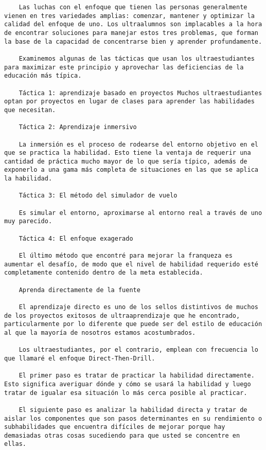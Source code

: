 \begin{verbatim}
	Las luchas con el enfoque que tienen las personas generalmente vienen en tres variedades amplias: comenzar, mantener y optimizar la calidad del enfoque de uno. Los ultraalumnos son implacables a la hora de encontrar soluciones para manejar estos tres problemas, que forman la base de la capacidad de concentrarse bien y aprender profundamente.
	
	Examinemos algunas de las tácticas que usan los ultraestudiantes para maximizar este principio y aprovechar las deficiencias de la educación más típica. 
	
	Táctica 1: aprendizaje basado en proyectos Muchos ultraestudiantes optan por proyectos en lugar de clases para aprender las habilidades que necesitan.
	
	Táctica 2: Aprendizaje inmersivo
	
	La inmersión es el proceso de rodearse del entorno objetivo en el que se practica la habilidad. Esto tiene la ventaja de requerir una cantidad de práctica mucho mayor de lo que sería típico, además de exponerlo a una gama más completa de situaciones en las que se aplica la habilidad.
	
	Táctica 3: El método del simulador de vuelo
	
	Es simular el entorno, aproximarse al entorno real a través de uno muy parecido.
	
	Táctica 4: El enfoque exagerado
	
	El último método que encontré para mejorar la franqueza es aumentar el desafío, de modo que el nivel de habilidad requerido esté completamente contenido dentro de la meta establecida. 
	
	Aprenda directamente de la fuente
	
	El aprendizaje directo es uno de los sellos distintivos de muchos de los proyectos exitosos de ultraaprendizaje que he encontrado, particularmente por lo diferente que puede ser del estilo de educación al que la mayoría de nosotros estamos acostumbrados.
	
	Los ultraestudiantes, por el contrario, emplean con frecuencia lo que llamaré el enfoque Direct-Then-Drill.
	
	El primer paso es tratar de practicar la habilidad directamente. Esto significa averiguar dónde y cómo se usará la habilidad y luego tratar de igualar esa situación lo más cerca posible al practicar. 
	
	El siguiente paso es analizar la habilidad directa y tratar de aislar los componentes que son pasos determinantes en su rendimiento o subhabilidades que encuentra difíciles de mejorar porque hay demasiadas otras cosas sucediendo para que usted se concentre en ellas.
	

\end{verbatim}
